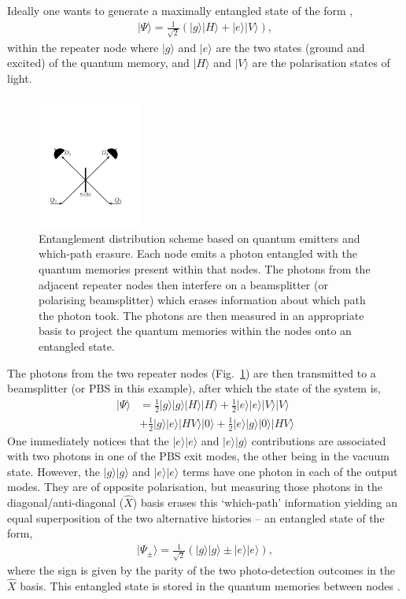 \documentclass[twocolumn, aps, rmp, amsmath, amssymb, nofootinbib, superscriptaddress, longbibliography, floatfix, table-of-contents, eqsecnum]{revtex4-1}
\newcommand{\ket}[1]{|#1\rangle}
\begin{document}
Ideally one wants to generate a maximally entangled state of the form \cite{bib:WJM2015},
\begin{align}
|\Psi\rangle=\frac{1}{\sqrt{2}} (|g\rangle |H\rangle + |e\rangle |V\rangle),
\end{align}
within the repeater node where $\ket{g}$ and $\ket{e}$ are the two states (ground and excited) of the quantum memory, and $\ket{H}$ and $\ket{V}$ are the polarisation states of light. 
\begin{figure}[!htb]
\includegraphics[width=0.3\textwidth]{repeaters_3}
\caption{Entanglement distribution scheme based on quantum emitters and which-path erasure. Each node emits a photon entangled with the quantum memories present within that nodes. The photons from the adjacent repeater nodes then interfere on a beamsplitter (or polarising beamsplitter) which erases information about which path the photon took. The photons are then measured in an appropriate basis to project the quantum memories within the nodes onto an entangled state.} 
\label{fig:repeaters_3}
\end{figure} 
The photons from the two repeater nodes (Fig.~\ref{fig:repeaters_3}) are then transmitted to a beamsplitter (or PBS in this example), after which the state of the system is,
\begin{align}
|\Psi\rangle &= \frac{1}{2} |g\rangle |g\rangle |H\rangle |H\rangle +\frac{1}{2} |e\rangle |e\rangle |V\rangle |V\rangle \nonumber \\
&+\frac{1}{2} |g\rangle |e\rangle |HV\rangle |0\rangle + \frac{1}{2} |e\rangle |g\rangle |0\rangle |HV\rangle 
\end{align}
One immediately notices that the $|e\rangle |e\rangle$ and $|e\rangle |g\rangle$ contributions are associated with two photons in one of the PBS exit modes, the other being in the vacuum state. However, the $|g\rangle |g\rangle$ and $|e\rangle |e\rangle$ terms have one photon in each of the output modes. They are of opposite polarisation, but measuring those photons in the diagonal/anti-diagonal ($\hat{X}$) basis erases this `which-path' information yielding an equal superposition of the two alternative histories -- an entangled state of the form,
\begin{align}
|\Psi_\pm\rangle=\frac{1}{\sqrt{2}} (|g\rangle |g\rangle \pm |e\rangle |e\rangle),
\end{align}
where the sign is given by the parity of the two photo-detection outcomes in the $\hat{X}$ basis. This entangled state is stored in the quantum memories between nodes \cite{}. 
\end{document}
